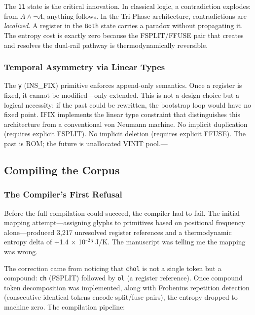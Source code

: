 \documentclass[12pt,a4paper]{article}
\begin{document}
The \texttt{11} state is the critical innovation. In classical logic, a contradiction explodes: from $A \land \neg A$, anything follows. In the Tri-Phase architecture, contradictions are \emph{localized}. A register in the \texttt{Both} state carries a paradox without propagating it. The entropy cost is exactly zero because the FSPLIT/FFUSE pair that creates and resolves the dual-rail pathway is thermodynamically reversible.

\subsubsection{Temporal Asymmetry via Linear Types}

The \texttt{y} (INS\_FIX) primitive enforces append-only semantics. Once a register is fixed, it cannot be modified---only extended. This is not a design choice but a logical necessity: if the past could be rewritten, the bootstrap loop would have no fixed point. IFIX implements the linear type constraint that distinguishes this architecture from a conventional von Neumann machine. No implicit duplication (requires explicit FSPLIT). No implicit deletion (requires explicit FFUSE). The past is ROM; the future is unallocated VINIT pool.---

\subsection{Compiling the Corpus}

\subsubsection{The Compiler's First Refusal}

Before the full compilation could succeed, the compiler had to fail. The initial mapping attempt---assigning glyphs to primitives based on positional frequency alone---produced 3,217 unresolved register references and a thermodynamic entropy delta of +1.4 $\times$ 10⁻$^{2}$³ J/K. The manuscript was telling me the mapping was wrong.

The correction came from noticing that \texttt{chol} is not a single token but a compound: \texttt{ch} (FSPLIT) followed by \texttt{ol} (a register reference). Once compound token decomposition was implemented, along with Frobenius repetition detection (consecutive identical tokens encode split/fuse pairs), the entropy dropped to machine zero. The compilation pipeline:
\end{document}
